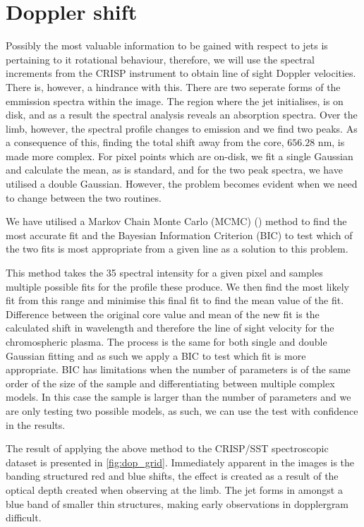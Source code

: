 \documentclass{emulateapj}
\begin{document}
\section{Doppler shift}
\label{dop_shift_sect}

Possibly the most valuable information to be gained with respect to jets is pertaining to it rotational behaviour, therefore, we will use the spectral increments from the CRISP instrument to obtain line of sight Doppler velocities.
There is, however, a hindrance with this.
There are two seperate forms of the emmission spectra within the image.
The region where the jet initialises, is on disk, and as a result the spectral analysis reveals an absorption spectra.
Over the limb, however, the spectral profile changes to emission and we find two peaks.
As a consequence of this, finding the total shift away from the core, $656.28$ nm, is made more complex.
For pixel points which are on-disk, we fit a single Gaussian and calculate the mean, as is standard, and for the two peak spectra, we have utilised a double Gaussian.
However, the problem becomes evident when we need to change between the two routines.

We have utilised a Markov Chain Monte Carlo (MCMC) (\cite{Richey2010}) method to find the most accurate fit and the Bayesian Information Criterion (BIC) to test which of the two fits is most appropriate from a given line as a solution to this problem.

This method takes the 35 spectral intensity for a given pixel and samples multiple possible fits for the profile these produce.
We then find the most likely fit from this range and minimise this final fit to find the mean value of the fit.
Difference between the original core value and mean of the new fit is the calculated shift in wavelength and therefore the line of sight velocity for the chromospheric plasma.
The process is the same for both single and double Gaussian fitting and as such we apply a BIC to test which fit is more appropriate.
BIC has limitations when the number of parameters is of the same order of the size of the sample and differentiating between multiple complex models.
In this case the sample is larger than the number of parameters and we are only testing two possible models, as such, we can use the test with confidence in the results.

The result of applying the above method to the CRISP/SST spectroscopic dataset is presented in \cref{fig:dop_grid}.
Immediately apparent in the images is the banding structured red and blue shifts, the effect is created as a result of the optical depth created when observing at the limb. 
The jet forms in amongst a blue band of smaller thin structures, making early observations in dopplergram difficult.  
\end{document}
